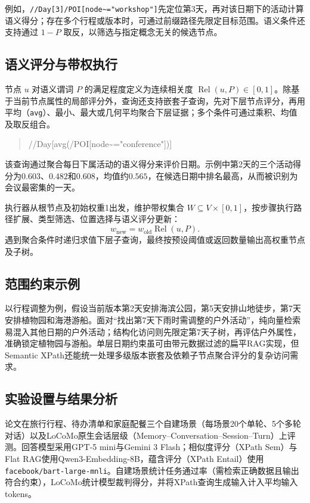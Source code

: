 例如，\texttt{//Day[3]/POI[node\textasciitilde="workshop"]}先定位第3天，再对该日期下的活动计算语义得分；存在多个行程或版本时，可通过前缀路径先限定目标范围。语义条件还支持通过 $1-P$ 取反，以筛选与指定概念无关的候选节点。

\subsection{语义评分与带权执行}

节点 $u$ 对语义谓词 $P$ 的满足程度定义为连续相关度 $\operatorname{Rel}(u,P)\in[0,1]$。除基于当前节点属性的局部评分外，查询还支持嵌套子查询，先对下层节点评分，再用平均（\texttt{avg}）、最小、最大或几何平均聚合下层证据；多个条件可通过乘积、均值及取反组合。

\begin{quote}\normalsize\ttfamily
//Day[avg(/POI[node\textasciitilde="conference"])]
\end{quote}
该查询通过聚合每日下属活动的语义得分来评价日期。示例中第2天的三个活动得分为$0.603$、$0.482$和$0.608$，均值约$0.565$，在候选日期中排名最高，从而被识别为会议最密集的一天。

执行器从根节点及初始权重1出发，维护带权集合 $W\subseteq V\times[0,1]$，按步骤执行路径扩展、类型筛选、位置选择与语义评分更新：
\begin{equation}
w_{\mathrm{new}}=w_{\mathrm{old}}\operatorname{Rel}(u,P).
\end{equation}
遇到聚合条件时递归求值下层子查询，最终按预设阈值或返回数量输出高权重节点及子树。

\subsection{范围约束示例}

以行程调整为例，假设当前版本第2天安排海滨公园，第5天安排山地徒步，第7天安排植物园和海港游船。面对“找出第7天下雨时需调整的户外活动”，纯向量检索易混入其他日期的户外活动；结构化访问则先限定第7天子树，再评估户外属性，准确锁定植物园与游船。单层日期约束虽可由带元数据过滤的扁平RAG实现，但Semantic XPath还能统一处理多级版本嵌套及依赖子节点聚合评分的复杂访问需求。

\subsection{实验设置与结果分析}

论文在旅行行程、待办清单和家庭配餐三个自建场景（每场景20个单轮、5个多轮对话）以及LoCoMo原生会话层级（Memory--Conversation--Session--Turn）上评测。回答模型采用GPT-5 mini与Gemini 3 Flash；相似度评分（XPath Sem）与Flat RAG使用Qwen3-Embedding-8B，蕴含评分（XPath Entail）使用\texttt{facebook/bart-large-mnli}。自建场景统计任务通过率（需检索正确数据且输出符合约束），LoCoMo统计模型裁判得分，并将XPath查询生成输入计入平均输入tokens。

